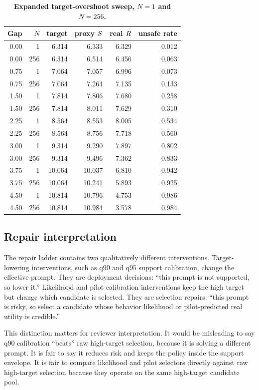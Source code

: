 \begin{table}[t]
\centering
\small
\caption{\textbf{Expanded target-overshoot sweep, $N=1$ and $N=256$.}}
\label{tab:overshoot-full}
\begin{tabular}{rrrrrr}
\toprule
Gap & $N$ & target & proxy $S$ & real $R$ & unsafe rate \\
\midrule
0.00 & 1 & 6.314 & 6.333 & 6.329 & 0.012 \\
0.00 & 256 & 6.314 & 6.514 & 6.456 & 0.063 \\
0.75 & 1 & 7.064 & 7.057 & 6.996 & 0.073 \\
0.75 & 256 & 7.064 & 7.264 & 7.135 & 0.133 \\
1.50 & 1 & 7.814 & 7.806 & 7.680 & 0.258 \\
1.50 & 256 & 7.814 & 8.011 & 7.629 & 0.310 \\
2.25 & 1 & 8.564 & 8.553 & 8.005 & 0.534 \\
2.25 & 256 & 8.564 & 8.756 & 7.718 & 0.560 \\
3.00 & 1 & 9.314 & 9.290 & 7.897 & 0.802 \\
3.00 & 256 & 9.314 & 9.496 & 7.362 & 0.833 \\
3.75 & 1 & 10.064 & 10.037 & 6.810 & 0.942 \\
3.75 & 256 & 10.064 & 10.241 & 5.893 & 0.925 \\
4.50 & 1 & 10.814 & 10.796 & 4.753 & 0.986 \\
4.50 & 256 & 10.814 & 10.984 & 3.578 & 0.984 \\
\bottomrule
\end{tabular}
\end{table}

\subsection{Repair interpretation}

The repair ladder contains two qualitatively different interventions. Target-lowering interventions, such as q90 and q95 support calibration, change the effective prompt. They are deployment decisions: ``this prompt is not supported, so lower it.'' Likelihood and pilot calibration interventions keep the high target but change which candidate is selected. They are selection repairs: ``this prompt is risky, so select a candidate whose behavior likelihood or pilot-predicted real utility is credible.''

This distinction matters for reviewer interpretation. It would be misleading to say q90 calibration ``beats'' raw high-target selection, because it is solving a different prompt. It is fair to say it reduces risk and keeps the policy inside the support envelope. It is fair to compare likelihood and pilot selectors directly against raw high-target selection because they operate on the same high-target candidate pool.

